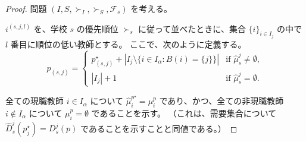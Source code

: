 \documentclass[12pt, a4paper]{article}
\theoremstyle{definition}
\theoremstyle{remark}
\theoremstyle{plain}
\begin{document}
\begin{proof}
問題 $(I, S, \succ_I, \succ_S, \mathcal{F}_s)$ を考える。

$i^{(s,j,l)}$ を、学校 $s$ の優先順位 $\succ_s$ に従って並べたときに、集合 $\{i\}_{i \in I_j}$ の中で $l$ 番目に順位の低い教師とする。
ここで、次のように定義する。
\[
p_{(s,j)} =
\begin{cases}
p_{(s,j)}^\star + |I_j \setminus \{i \in I_\alpha: B(i) = \{j\}\}| & \text{if } \widehat{\mu}_s^j \neq \emptyset, \\
|I_j| + 1      & \text{if } \widehat{\mu}_s^j = \emptyset.
\end{cases}
\]




全ての現職教師 $i \in I_\alpha$ について $\widehat{\mu}_i^{p^\star} = \mu_i^p$ であり、かつ、全ての非現職教師 $i \notin I_\alpha$ について $\mu_i^p = \emptyset$ であることを示す。
（これは、需要集合について $\widehat{D}_s^j(p^\star_j) = D_s^j(p)$ であることを示すことと同値である。）





\end{proof}
\end{document}
